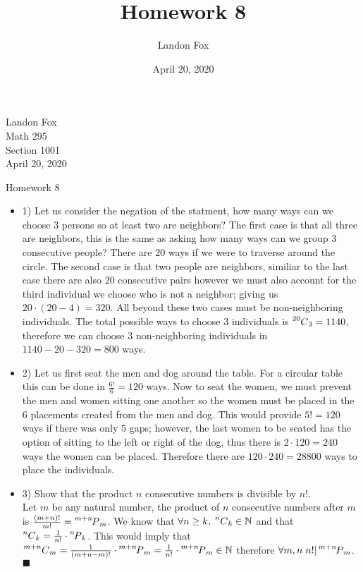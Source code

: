 \documentclass[ 12pt ]{article}
\newcommand\Myperm[2][^n]{\prescript{#1\mkern-2.5mu}{}P_{#2}}
\newcommand\Mycomb[2][^n]{\prescript{#1\mkern-0.5mu}{}C_{#2}}
\begin{document}
\title{Homework 8}
\author{Landon Fox}
\date{April 20, 2020}

\begin{flushleft}
Landon Fox \\
Math 295 \\
Section 1001 \\
April 20, 2020
\end{flushleft}
\begin{center}
\Large Homework 8
\end{center}

\begin{itemize}
	\item[] {\large 1)}
	Let us consider the negation of the statment, how many ways can we choose 3 persons so at least two are neighbors?
	The first case is that all three are neighbors, this is the same as asking how many ways can we group 3
	consecutive people? There are $20$ ways if we were to traverse around the circle. The second case is that
	two people are neighbors, similiar to the last case there are also $20$ consecutive pairs however we must
	also account for the third individual we choose who is not a neighbor; giving us $20 \cdot (20-4)=320$.
	All beyond these two cases must be non-neighboring individuals. The total possible ways to choose 3
	individuals is $\Mycomb[20]{3}=1140$, therefore we can choose 3 non-neighboring individuals in
	$1140-20-320=800$ ways.

	\item[] {\large 2)}
	Let us first seat the men and dog around the table. For a circular table this can be done in $\frac{6!}{6}=120$
	ways. Now to seat the women, we must prevent the men and women sitting one another so the women must be placed
	in the $6$ placements created from the men and dog. This would provide $5!=120$ ways if there was only $5$ gaps;
	however, the last women to be seated has the option of sitting to the left or right of the dog, thus there is 
	$2 \cdot 120=240$ ways the women can be placed. Therefore there are $120 \cdot 240=28800$ ways to place the
	individuals.

	\item[] {\large 3)}
	Show that the product $n$ consecutive numbers is divisible by $n!$. \\
	Let $m$ be any natural number, the product of $n$ consecutive numbers after $m$ is
	$\frac{(m+n)!}{m!}=\Myperm[m+n]{m}$. We know that $\forall n \geq k,\; \Mycomb[n]{k} \in \mathbb{N}$
	and that $\Mycomb[n]{k} = \frac{1}{n!} \cdot \Myperm[n]{k}$. This would imply that
	$\Mycomb[m+n]{m}=\frac{1}{(m+n-m)!} \cdot \Myperm[m+n]{m} = \frac{1}{n!} \cdot \Myperm[m+n]{m} \in \mathbb{N}$
	therefore $\forall m,n\; n! | \Myperm[m+n]{m}$. $\blacksquare$


\end{itemize}
\end{document}
